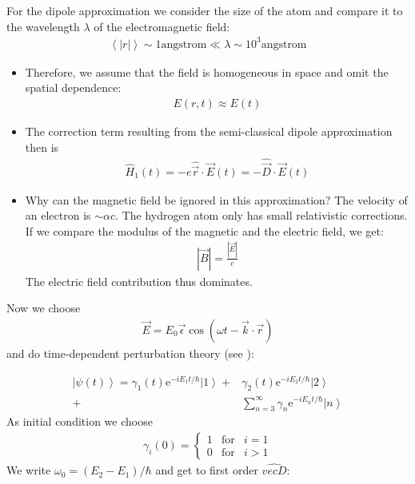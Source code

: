 \documentclass[10pt]{article}
\let\cite\citep
\providecommand\citep{\cite}
\newcommand{\ket}[1]{\ensuremath{\left|#1\right\rangle}}
\newcommand{\braket}[1]{\ensuremath{\left\langle#1\right\rangle}}
\newcommand{\eexp}[1]{\mathrm{e}^{#1}}
\begin{document}
For the dipole approximation we consider the size of the atom and compare it to the wavelength $\lambda$ of the electromagnetic field:
\begin{align}
\braket{|r|} \sim 1\text{angstrom}\ll \lambda \sim 10^3\text{angstrom}
\end{align}

\begin{itemize}
\item Therefore, we assume that the field is homogeneous in space and omit the spatial dependence:
\begin{align}
E(r,t) \approx E(t)
\end{align}  
\item The correction term resulting from the semi-classical dipole approximation then is
\begin{align}
\hat{H}_1(t)=-e\hat{\vec{r}} \cdot \vec{E}(t) = -\hat{\vec{D}} \cdot \vec{E}(t)
\end{align}
\item Why can the magnetic field be ignored in this approximation? The velocity of an electron is $\sim \alpha c$. The hydrogen atom only has small relativistic corrections. If we compare the modulus of the magnetic and the electric field, we get:
\begin{align}
\left| \vec{B} \right| = \frac{|\vec{E}|}{c}
\end{align}
The electric field contribution thus dominates.
\end{itemize}
%
Now we choose 
\begin{align}
\vec{E} = E_0 \vec{\epsilon} \cos \left(\omega t - \vec{k} \cdot \vec{r}\right)
\end{align}
and do time-\-de\-pen\-dent perturbation theory (see \cite{Jendrzejewski}):

\begin{align}
\ket{\psi(t)} = \gamma_1(t) \eexp{-iE_1t/\hbar} \ket{1} +& \gamma_2(t) \eexp{-iE_2t/\hbar} \ket{2}\\
+&\sum_{n=3}^\infty \gamma_n \eexp{-iE_nt/\hbar} \ket{n}
\end{align}
As initial condition we choose
\begin{align}
 \gamma_i(0) = \left\{ \begin{array}{ccc} 1 &\text{for}&  i=1 \\ 0 &\text{for}& i>1  \end{array} \right.
\end{align}
%
We write $\omega_0 = (E_2-E_1)/\hbar$ and get to first order $\hat{vec{D}}$:
\end{document}
